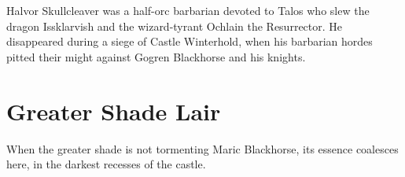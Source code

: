 Halvor Skullcleaver was a half-orc barbarian devoted to Talos who slew the dragon
Issklarvish and the wizard-tyrant Ochlain the Resurrector. He disappeared during
a siege of Castle Winterhold, when his barbarian hordes pitted their might against
Gogren Blackhorse and his knights.

\section{Greater Shade Lair}

When the greater shade is not tormenting Maric Blackhorse, its essence coalesces
here, in the darkest recesses of the castle.
